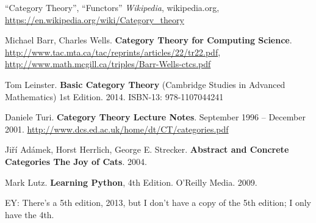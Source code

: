 \documentclass[twoside,landscape,10pt]{amsart}
\theoremstyle{plain}
\theoremstyle{definition}
\theoremstyle{remark}
\begin{document}
\begin{thebibliography}{9}

``Category Theory'', ``Functors'' \emph{Wikipedia}, wikipedia.org, \url{https://en.wikipedia.org/wiki/Category_theory}

Michael Barr, Charles Wells.  \textbf{Category Theory for Computing Science}.  \url{http://www.tac.mta.ca/tac/reprints/articles/22/tr22.pdf}, \url{http://www.math.mcgill.ca/triples/Barr-Wells-ctcs.pdf}

Tom Leinster.  \textbf{Basic Category Theory} (Cambridge Studies in Advanced Mathematics) 1st Edition.  2014.  ISBN-13: 978-1107044241


Daniele Turi. \textbf{Category Theory Lecture Notes}.  September 1996 – December 2001.  \url{http://www.dcs.ed.ac.uk/home/dt/CT/categories.pdf}

Ji\v{r}\'{i} Ad\'{a}mek, Horst Herrlich, George E. Strecker.   \textbf{Abstract and Concrete Categories The Joy of Cats}. 2004.   

Mark Lutz.  \textbf{Learning Python}, 4th Edition. O'Reilly Media. 2009.  

EY: There's a 5th edition, 2013, but I don't have a copy of the 5th edition; I only have the 4th.  




\end{thebibliography}
\end{document}
